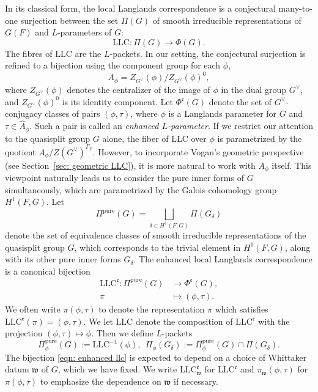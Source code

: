 \documentclass[11pt,letterpaper]{amsart}
\newcommand{\dualgroup}[1]{{#1}^\vee}
\newcommand{\irrepdual}[1]{\widehat{#1}}
\newcommand{\pure}{\mathrm{pure}}
\newcommand{\mfr}[1]{\mathfrak{#1}}
\newcommand{\LLC}{\mathrm{LLC}}
\renewcommand{\1}{\mathbbm{1}}
\numberwithin{equation}{section}
\begin{document}
{In its classical form, the local Langlands correspondence is a conjectural many-to-one surjection between the set $\Pi(G)$ of smooth irreducible representations of $G(F)$ and $L$-parameters of $G$:
 \[ \LLC: \Pi(G) \to \Phi(G).\]
The fibres of $\LLC$ are the $L$-packets. In our setting, the conjectural surjection is refined to a bijection using the component group for each $\phi$,
\begin{equation}\label{eqn: a phi}
    A_\phi = Z_{\dualgroup{G}}(\phi)/Z_{\dualgroup{G}}(\phi)^0,
\end{equation}
where $Z_{\dualgroup{G}}(\phi)$ denotes the centralizer of the image of $\phi$ in the dual group $\dualgroup{G}$, and $Z_{\dualgroup{G}}(\phi)^0$ is its identity component. 
Let $\Phi^\mathfrak{e}(G)$ denote the set of $\dualgroup{G}$-conjugacy classes of pairs $(\phi, \tau)$, where $\phi$ is a Langlands parameter for $G$ and $\tau \in \irrepdual{A}_\phi$. Such a pair is called an \emph{enhanced $L$-parameter}. If we restrict our attention to the quasisplit group $G$ alone, the fiber of $\LLC$ over $\phi$ is parametrized by the quotient $A_{\phi}/Z(\dualgroup{G})^{\Gamma_F}$. However, to incorporate Vogan's geometric perspective (see Section~\ref{sec: geometric LLC}), it is more natural to work with $A_{\phi}$ itself. This viewpoint naturally leads us to consider the pure inner forms of $G$ simultaneously, which are parametrized by the Galois cohomology group $H^1(F,G)$. Let
\[\Pi^\pure(G)=\bigsqcup_{\delta\in H^1(F,G)}\Pi(G_\delta)\]
denote the set of equivalence classes of smooth irreducible representations of the quasisplit group $G$, which corresponds to the trivial element in $ H^1(F,G)$,
along with its other pure inner forms $G_{\delta}$. The enhanced local Langlands correspondence is a canonical bijection 
\begin{equation}\label{eqn: enhanced llc}
    \begin{array}{cc}
             \LLC^\mathfrak{e}: \Pi^\pure(G) &\to \Phi^\mathfrak{e}(G),  \\
         \pi&\mapsto (\phi, \tau). 
    \end{array}
\end{equation}
We often write $\pi(\phi,\tau)$ to denote the representation $\pi$ which satisfies $\LLC^\mathfrak{e}(\pi)=(\phi,\tau)$. 
We let $\LLC$ denote the composition of $\LLC^\mathfrak{e}$ with the projection $(\phi, \tau) \mapsto \phi$. Then we define $L$-packets
\[ \Pi_{\phi}^{\pure} (G):= \LLC^{-1}(\phi),\ \ \Pi_{\phi} (G_{\delta}):= \Pi_{\phi}^{\pure} (G) \cap \Pi(G_{\delta}).\]
The bijection \eqref{eqn: enhanced llc} is expected to depend on a choice of Whittaker datum $\mathfrak{w}$ of $G$, which we have fixed. We write $\LLC^{\mfr{e}}_{\mfr{w}}$ for $\LLC^{\mfr{e}}$ and $\pi_{\mfr{w}}(\phi,\tau)$ for $\pi(\phi,\tau)$ to emphasize the dependence on $\mfr{w}$ if necessary. 

}
\end{document}
